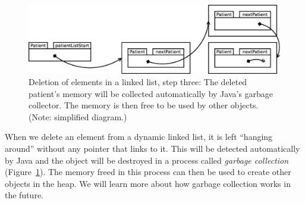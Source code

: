 \begin{figure}[p]
  \centering
  \includegraphics[width=14cm]{gfx/lists-remove-3}    
  \caption{Deletion of elements in a linked list, step three: 
    The deleted patient's memory will be collected automatically by
    Java's garbage collector. The memory is then free to be used by
    other objects.
    (Note: simplified diagram.)}
  \label{fig:deletelinklist3}
\end{figure}

When we delete an element from a dynamic linked list, it is left
``hanging around'' without any pointer that links to it. This will be
detected automatically by Java and the object will be destroyed in a
process called \emph{garbage collection} 
(Figure~\ref{fig:deletelinklist3}). The memory freed in this
process can then be used to create other objects in the heap. We will
learn more about how garbage collection works in the future. %





